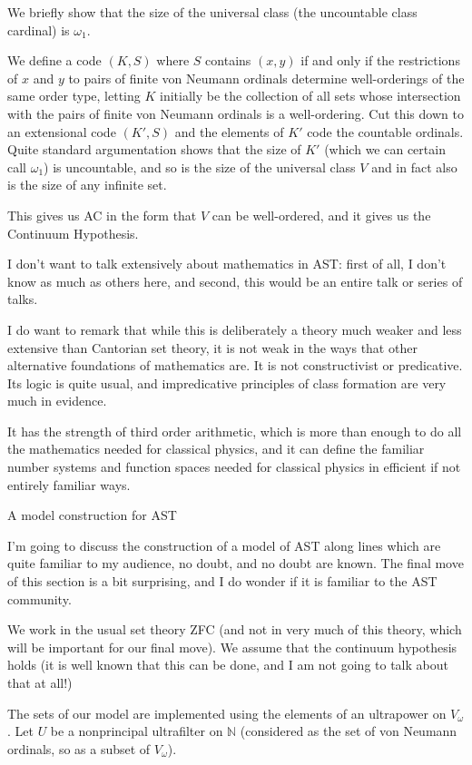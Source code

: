 \documentclass{slides}
\begin{document}
\begin{slide}

We briefly show that the size of the universal class (the uncountable class cardinal) is $\omega_1$.

We define a code $(K,S)$ where $S$ contains $(x,y)$ if and only if the restrictions of $x$ and $y$ to pairs of finite von Neumann ordinals determine well-orderings of the same order type, letting $K$ initially be the collection of all sets whose intersection with the pairs of finite von Neumann ordinals is a well-ordering.  Cut this down to an extensional code $(K',S)$ and the elements of $K'$ code the countable ordinals.  Quite standard argumentation shows that the size of $K'$ (which we can certain call $\omega_1$) is uncountable, and so is the size of the universal class $V$ and in fact also is the size of any infinite set.

This gives us AC in the form that $V$ can be well-ordered, and it gives us the Continuum Hypothesis.

\end{slide}

\begin{slide}

I don't want to talk extensively about mathematics in AST:  first of all, I don't know as much as others here, and second, this would be an entire talk or series of talks.

I do want to remark that while this is deliberately a theory much weaker and less extensive than Cantorian set theory, it is not weak in the ways that other alternative foundations of mathematics are.  It is not constructivist or predicative.  Its logic is quite usual, and impredicative principles of class formation are very much in evidence.

It has the strength of third order arithmetic, which is more than enough to do all the mathematics needed for classical physics, and it can define the familiar number systems and function spaces needed for classical physics in efficient if not entirely familiar ways.

\end{slide}

\begin{slide}

{\Large A model construction for AST}

I'm going to discuss the construction of a model of AST along lines which are quite familiar to my audience, no doubt, and no doubt are known.  The final move of this section is a bit surprising, and I do wonder if it is familiar to the AST community.

We work in the usual set theory ZFC (and not in very much of this theory, which will be important for our final move).
We assume that the continuum hypothesis holds (it is well known that this can be done, and I am not going to talk about that at all!)

The sets of our model are implemented using the elements of an ultrapower on $V_\omega$.  Let $U$ be a nonprincipal ultrafilter on $\mathbb N$ (considered as the set of von Neumann ordinals, so as a subset of $V_\omega$).

\end{slide}
\end{document}

